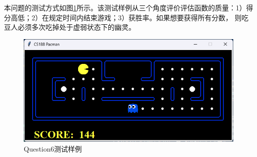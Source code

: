 本问题的测试方式如图\ref{q6test}所示。该测试样例从三个角度评价评估函数的质量：1）得分高低；2）在规定时间内结束游戏；3）获胜率。如果想要获得所有分数，
则吃豆人必须多次吃掉处于虚弱状态下的幽灵。
\begin{figure}[H]
    \centering
    \includegraphics[scale = 0.7]{pic/q6test.png}
    \caption{Question6测试样例}\label{q6test}
\end{figure}
%
%
